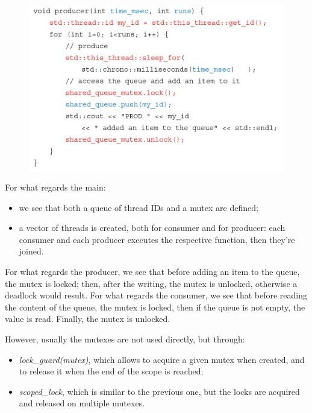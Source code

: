 \begin{figure}[h!]
		\centering
		\includegraphics[scale = 1.4]{img/cp_p.jpg}
        \label{producer}
\end{figure}

For what regards the main:

\begin{itemize}
    \item we see that both a queue of thread IDs and a mutex are defined;
    \item a vector of threads is created, both for consumer and for producer: each consumer and each producer executes the respective function, then they're joined.
\end{itemize}

For what regards the producer, we see that before adding an item to the queue, the mutex is locked; then, after the writing, the mutex is unlocked, otherwise a deadlock would result. For what regards the consumer, we see that before reading the content of the queue, the mutex is locked, then if the queue is not empty, the value is read. Finally, the mutex is unlocked.

However, usually the mutexes are not used directly, but through:

\begin{itemize}
    \item \textit{lock\_guard(mutex)}, which allows to acquire a given mutex when created, and to release it when the end of the scope is reached;
    \item \textit{scoped\_lock}, which is similar to the previous one, but the locks are acquired and released on multiple mutexes.
\end{itemize}

